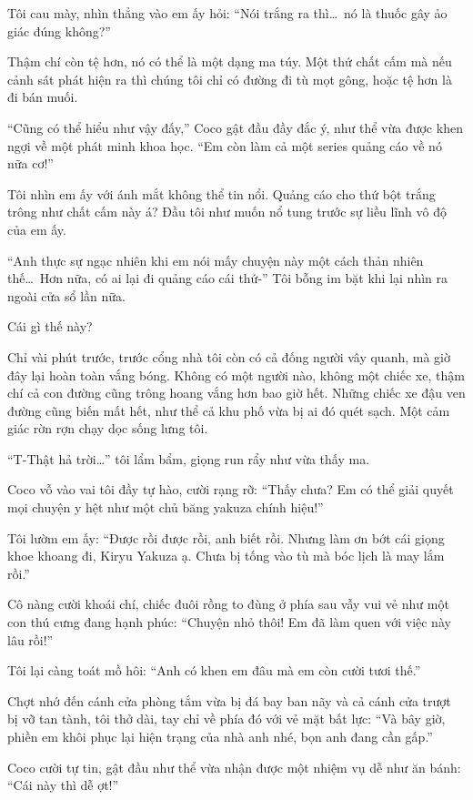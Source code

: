 \documentclass[../main.tex]{subfiles}
\begin{document}
Tôi cau mày, nhìn thẳng vào em ấy hỏi: ``Nói trắng ra thì\dots\ nó là thuốc gây ảo giác đúng không?''

Thậm chí còn tệ hơn, nó có thể là một dạng ma túy. Một thứ chất cấm mà nếu cảnh sát phát hiện ra thì chúng tôi chỉ có đường đi tù mọt gông, hoặc tệ hơn là đi bán muối.

``Cũng có thể hiểu như vậy đấy,'' Coco gật đầu đầy đắc ý, như thể vừa được khen ngợi về một phát minh khoa học. ``Em còn làm cả một series quảng cáo về nó nữa cơ!''

Tôi nhìn em ấy với ánh mắt không thể tin nổi. Quảng cáo cho thứ bột trắng trông như chất cấm này á? Đầu tôi như muốn nổ tung trước sự liều lĩnh vô độ của em ấy.

``Anh thực sự ngạc nhiên khi em nói mấy chuyện này một cách thản nhiên thế\dots\ Hơn nữa, có ai lại đi quảng cáo cái thứ-'' Tôi bỗng im bặt khi lại nhìn ra ngoài cửa sổ lần nữa.

Cái gì thế này?

Chỉ vài phút trước, trước cổng nhà tôi còn có cả đống người vây quanh, mà giờ đây lại hoàn toàn vắng bóng. Không có một người nào, không một chiếc xe, thậm chí cả con đường cũng trông hoang vắng hơn bao giờ hết. Những chiếc xe đậu ven đường cũng biến mất hết, như thể cả khu phố vừa bị ai đó quét sạch. Một cảm giác rờn rợn chạy dọc sống lưng tôi.

``T-Thật hả trời\dots'' tôi lẩm bẩm, giọng run rẩy như vừa thấy ma.

Coco vỗ vào vai tôi đầy tự hào, cười rạng rỡ: ``Thấy chưa? Em có thể giải quyết mọi chuyện y hệt như một chủ băng yakuza chính hiệu!''

Tôi lườm em ấy: ``Được rồi được rồi, anh biết rồi. Nhưng làm ơn bớt cái giọng khoe khoang đi, Kiryu Yakuza ạ. Chưa bị tống vào tù mà bóc lịch là may lắm rồi.''

Cô nàng cười khoái chí, chiếc đuôi rồng to đùng ở phía sau vẫy vui vẻ như một con thú cưng đang hạnh phúc: ``Chuyện nhỏ thôi! Em đã làm quen với việc này lâu rồi!''

Tôi lại càng toát mồ hôi: ``Anh có khen em đâu mà em còn cười tươi thế.''

Chợt nhớ đến cánh cửa phòng tắm vừa bị đá bay ban nãy và cả cánh cửa trượt bị vỡ tan tành, tôi thở dài, tay chỉ về phía đó với vẻ mặt bất lực: ``Và bây giờ, phiền em khôi phục lại hiện trạng của nhà anh nhé, bọn anh đang cần gấp.''

Coco cười tự tin, gật đầu như thể vừa nhận được một nhiệm vụ dễ như ăn bánh: ``Cái này thì dễ ợt!''
\end{document}
